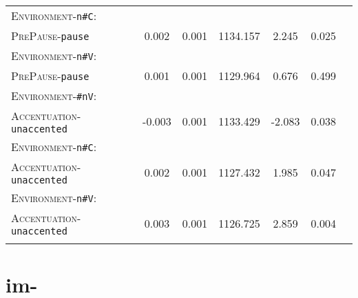 \begin{table}
{\begin{tabular}{lSSSSSS}
		\textsc{Environment}-\texttt{n\#C}:&&&&&\\
		\textsc{PrePause}-\texttt{pause} & 0.002 & 0.001 & 1134.157 & 2.245 & 0.025 \\ 
		
		\textsc{Environment}-\texttt{n\#V}:&&&&&\\
		\textsc{PrePause}-\texttt{pause} & \color{lsLightGray} 0.001 & \color{lsLightGray} 0.001 & \color{lsLightGray} 1129.964 & \color{lsLightGray} 0.676 & \color{lsLightGray} 0.499 \\ 
		
		\textsc{Environment}-\texttt{\#nV}:&&&&&\\
		\textsc{Accentuation}-\texttt{unaccented} & -0.003 & 0.001 & 1133.429 & -2.083 & 0.038 \\ 
		
		\textsc{Environment}-\texttt{n\#C}:&&&&&\\
		\textsc{Accentuation}-\texttt{unaccented} & 0.002 & 0.001 & 1127.432 & 1.985 & 0.047 \\ 
		
		\textsc{Environment}-\texttt{n\#V}:&&&&&\\
		\textsc{Accentuation}-\texttt{unaccented} & 0.003 & 0.001 & 1126.725 & 2.859 & 0.004 \\ 
		\lspbottomrule 
			\end{tabular}}
\end{table}


\section{{im-}}

